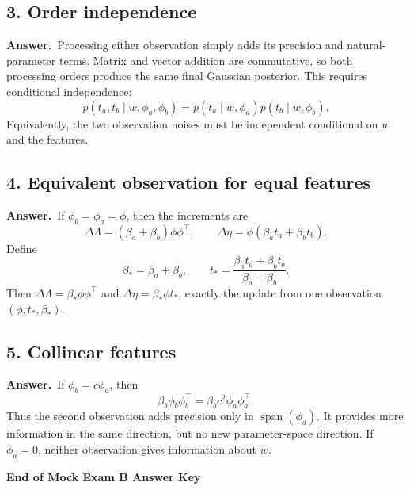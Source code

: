 \documentclass[11pt,a4paper]{article}
\newcommand{\answer}{\textbf{Answer.}\ }
\begin{document}
\subsection*{3. Order independence}

\answer Processing either observation simply adds its precision and natural-parameter terms. Matrix and vector addition are commutative, so both processing orders produce the same final Gaussian posterior. This requires conditional independence:
\[
  p(t_a,t_b\mid w,\phi_a,\phi_b)
  =p(t_a\mid w,\phi_a)p(t_b\mid w,\phi_b).
\]
Equivalently, the two observation noises must be independent conditional on $w$ and the features.

\subsection*{4. Equivalent observation for equal features}

\answer If $\phi_b=\phi_a=\phi$, then the increments are
\[
  \Delta\Lambda=(\beta_a+\beta_b)\phi\phi^\top,
  \qquad
  \Delta\eta=\phi(\beta_at_a+\beta_bt_b).
\]
Define
\[
  \boxed{\beta_*=\beta_a+\beta_b},
  \qquad
  \boxed{t_*=\frac{\beta_at_a+\beta_bt_b}{\beta_a+\beta_b}}.
\]
Then $\Delta\Lambda=\beta_*\phi\phi^\top$ and $\Delta\eta=\beta_*\phi t_*$, exactly the update from one observation $(\phi,t_*,\beta_*)$.

\subsection*{5. Collinear features}

\answer If $\phi_b=c\phi_a$, then
\[
  \beta_b\phi_b\phi_b^\top
  =\beta_bc^2\phi_a\phi_a^\top.
\]
Thus the second observation adds precision only in $\operatorname{span}(\phi_a)$. It provides more information in the same direction, but no new parameter-space direction. If $\phi_a=0$, neither observation gives information about $w$.

\vfill
\begin{center}
  \textbf{End of Mock Exam B Answer Key}
\end{center}
\end{document}
